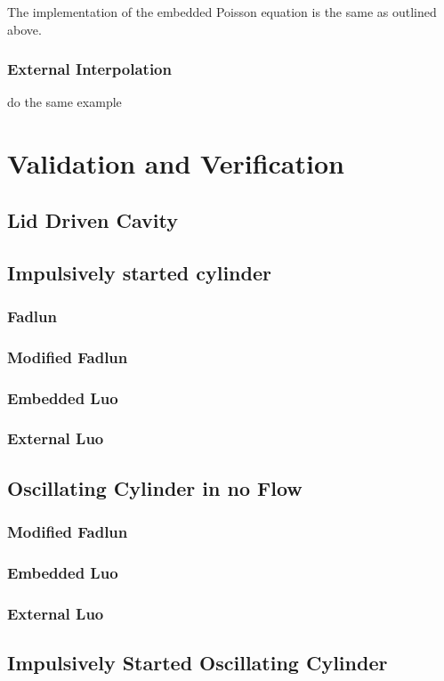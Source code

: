 \documentclass[onehalf,11pt]{beavtex}
\begin{document}
The implementation of the embedded Poisson equation is the same as outlined above.
\subsection{External Interpolation}
do the same example

\chapter{Validation and Verification}\label{Validation}
\section{Lid Driven Cavity}
\section{Impulsively started cylinder}
\subsection{Fadlun}
\subsection{Modified Fadlun}
\subsection{Embedded Luo}
\subsection{External Luo}
\section{Oscillating Cylinder in no Flow}
\subsection{Modified Fadlun}
\subsection{Embedded Luo}
\subsection{External Luo}
\section{Impulsively Started Oscillating Cylinder}
\end{document}
